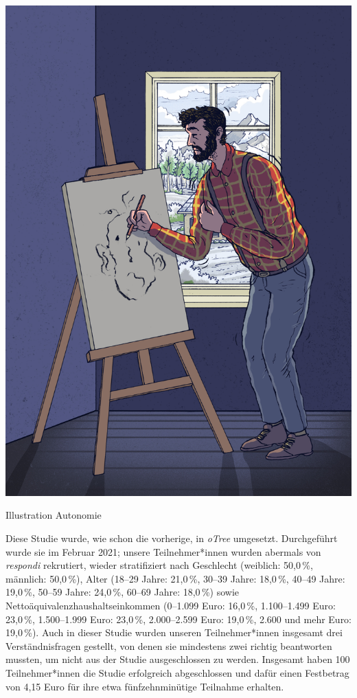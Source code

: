 \documentclass[justified,nobib,symmetric,twoside]{tufte-handout}
\begin{document}
\begin{marginfigure}[-0.1cm]
   \includegraphics[width=\linewidth]{figure_14.jpg}
   \caption{Illustration Autonomie}
   \label{fig:abbildung_14}
\end{marginfigure}

Diese Studie wurde, wie schon die vorherige, in \textit{oTree} umgesetzt.
Durchgeführt wurde sie im Februar 2021; unsere Teilnehmer*innen wurden abermals von \textit{respondi} rekrutiert, wieder stratifiziert nach Geschlecht (weiblich: 50,0\,\%, männlich: 50,0\,\%), Alter (18--29 Jahre: 21,0\,\%, 30--39 Jahre: 18,0\,\%, 40--49 Jahre: 19,0\,\%, 50--59 Jahre: 24,0\,\%, 60--69 Jahre: 18,0\,\%) sowie Nettoäquivalenzhaushaltseinkommen (0--1.099 Euro: 16,0\,\%, 1.100--1.499 Euro: 23,0\,\%, 1.500--1.999 Euro: 23,0\,\%, 2.000--2.599 Euro: 19,0\,\%, 2.600 und mehr Euro: 19,0\,\%).
Auch in dieser Studie wurden unseren Teilnehmer*innen insgesamt drei Verständnisfragen gestellt, von denen sie mindestens zwei richtig beantworten mussten, um nicht aus der Studie ausgeschlossen zu werden.
Insgesamt haben 100 Teilnehmer*innen die Studie erfolgreich abgeschlossen und dafür einen Festbetrag von 4,15 Euro für ihre etwa fünfzehnminütige Teilnahme erhalten.
\end{document}
